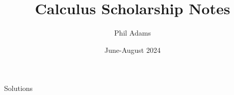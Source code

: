 \documentclass[12pt, letterpaper]{article}
\title{Calculus Scholarship Notes}
\author{Phil Adams}
\date{June-August 2024}
\begin{document}
\maketitle

\pagebreak

\tableofcontents
\setlength{\parskip}{10pt}
\pagebreak

\pagebreak

\pagebreak

\pagebreak

\pagebreak

\pagebreak

\pagebreak

\pagebreak

\pagebreak

\pagebreak

\pagebreak

\pagebreak

\pagebreak

\pagebreak

\pagebreak

\pagebreak

\pagebreak

\pagebreak

\pagebreak

\pagebreak

\pagebreak


\pagebreak
{}
\begin{center}
    \huge
    Solutions
    \normalsize
\end{center}
\restoregeometry

\pagebreak

\pagebreak

\pagebreak

\pagebreak

\pagebreak

\pagebreak

\pagebreak

\pagebreak

\pagebreak

\pagebreak

\pagebreak

\pagebreak

\pagebreak

\pagebreak

\pagebreak

\pagebreak

\pagebreak

\pagebreak

\pagebreak

\pagebreak

\end{document}
